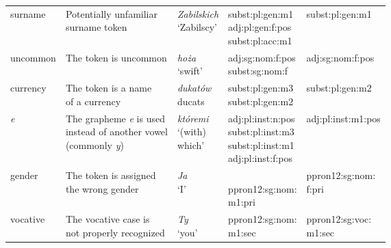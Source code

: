 \begin{longtable}[H]{p{2cm}p{4cm}p{1.5cm}p{3cm}p{3cm}}
surname & \makecell[l]{Potentially unfamiliar \\ surname token}  & \makecell[l]{\textit{Zabilskich} \\ `Zabilscy'} & \makecell[l]{subst:pl:gen:m1 \\ adj:pl:gen:f:pos \\ subst:pl:acc:m1} & subst:pl:gen:m1 \\ 

uncommon & The token is uncommon & \makecell[l]{\textit{hoża} \\ `swift'} & \makecell[l]{adj:sg:nom:f:pos \\ subst:sg:nom:f} & adj:sg:nom:f:pos \\ 

currency & \makecell[l]{The token is a name \\ of a currency} & \makecell[l]{\textit{dukatów} \\ ducats} & \makecell[l]{subst:pl:gen:m3 \\ subst:pl:gen:m2} & subst:pl:gen:m2 \\

\textit{e} & \makecell[l]{The grapheme \textit{e} is used \\ instead of another vowel \\ (commonly \textit{y})} & \makecell[l]{\textit{któremi} \\ `(with)\\which'} & \makecell[l]{adj:pl:inst:n:pos \\ subst:pl:inst:m3 \\ subst:pl:inst:m1 \\ adj:pl:inst:f:pos} & adj:pl:inst:m1:pos \\ 

gender & \makecell[l]{The token is assigned \\ the wrong gender} & \makecell[l]{\textit{Ja} \\ `I'} & \makecell[l]{\\ppron12:sg:nom:\\\hspace{0.5cm}m1:pri \\ {}} & \makecell[l]{ppron12:sg:nom:\\\hspace{0.5cm}f:pri} \\

vocative & \makecell[l]{The vocative case is \\ not properly recognized} & \makecell[l]{\textit{Ty} \\ `you'} & \makecell[l]{ppron12:sg:nom:\\\hspace{0.5cm}m1:sec} & \makecell[l]{ppron12:sg:voc:\\\hspace{0.5cm}m1:sec} \\


\end{longtable}
